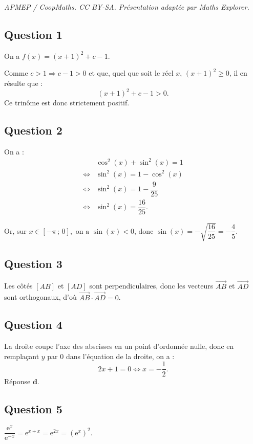 \documentclass[10pt]{article}
\providecommand{\e}{{\mathrm{e}}}
\begin{document}
\noindent\textit{APMEP / CoopMaths. CC BY-SA. Présentation adaptée par Maths Explorer.}\par\medskip
\subsection*{Question 1}

On a \( f(x) = (x + 1)^2 + c - 1 \).

Comme \( c > 1 \Rightarrow c - 1 > 0 \) et que, quel que soit le réel \( x \), \( (x + 1)^2 \geqslant 0 \), il en résulte que :
\[
(x + 1)^2 + c - 1 > 0.
\]
Ce trinôme est donc strictement positif.

\subsection*{Question 2}

On a :
\begin{align*}
&\cos^2(x) + \sin^2(x) = 1 \\
\iff &\sin^2(x) = 1 - \cos^2(x) \\
\iff &\sin^2(x) = 1 - \dfrac{9}{25} \\
\iff &\sin^2(x) = \dfrac{16}{25}.
\end{align*}

Or, sur \( x \in [-\pi \,;\, 0], \text{ on a } \sin(x) < 0 \), donc \( \sin(x) = -\sqrt{\dfrac{16}{25}} = -\dfrac{4}{5} \).

\subsection*{Question 3}

Les côtés \([AB]\) et \([AD]\) sont perpendiculaires, donc les vecteurs \(\overrightarrow{AB}\) et \(\overrightarrow{AD}\) sont orthogonaux, d'où \(\overrightarrow{AB} \cdot \overrightarrow{AD} = 0\).

\subsection*{Question 4}

La droite coupe l'axe des abscisses en un point d'ordonnée nulle, donc en remplaçant \(y\) par 0 dans l'équation de la droite, on a :
\[
2x + 1 = 0 \iff x = -\dfrac{1}{2}.
\]
Réponse \(\textbf{d.}\)

\subsection*{Question 5}

\( \dfrac{\e^x}{\e^{-x}} = \e^{x + x} = \e^{2x} = (\e^x)^2 \).
\end{document}
